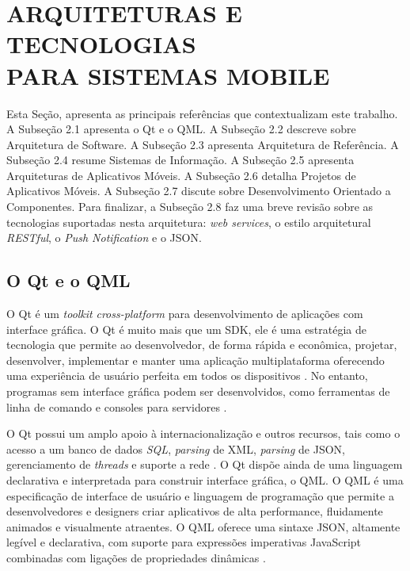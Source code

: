 \section{ARQUITETURAS E TECNOLOGIAS \\PARA SISTEMAS MOBILE}
Esta Seção, apresenta as principais referências que contextualizam este trabalho. A Subseção 2.1 apresenta o Qt e o QML. A Subseção 2.2 descreve sobre Arquitetura de Software. A Subseção 2.3 apresenta Arquitetura de Referência. A Subseção 2.4 resume Sistemas de Informação. A Subseção 2.5 apresenta Arquiteturas de Aplicativos Móveis. A Subseção 2.6 detalha Projetos de Aplicativos Móveis. A Subseção 2.7 discute sobre Desenvolvimento Orientado a Componentes. Para finalizar, a Subseção 2.8 faz uma breve revisão sobre as tecnologias suportadas nesta arquitetura: \textit{web services}, o estilo arquitetural \textit{RESTful}, o \textit{Push Notification} e o JSON.


\subsection{O Qt e o QML} %
O Qt é um \textit{toolkit} \textit{cross-platform} para desenvolvimento de aplicações com interface gráfica. O Qt é muito mais que um SDK, ele é uma estratégia de tecnologia que permite ao desenvolvedor, de forma rápida e econômica, projetar, desenvolver, implementar e manter uma aplicação multiplataforma oferecendo uma experiência de usuário perfeita em todos os dispositivos \cite{qt_io}. No entanto, programas sem interface gráfica podem ser desenvolvidos, como ferramentas de linha de comando e consoles para servidores \cite{qt_software}.\par

O Qt possui um amplo apoio à internacionalização e outros recursos, tais como o acesso a um banco de dados \textit{SQL}, \textit{parsing} de XML, \textit{parsing} de JSON, gerenciamento de \textit{threads} e suporte a rede \cite{qt_gui_toolkit}. O Qt dispõe ainda de uma linguagem declarativa e interpretada para construir interface gráfica, o QML. O QML é uma especificação de interface de usuário e linguagem de programação que permite a desenvolvedores e designers criar aplicativos de alta performance, fluidamente animados e visualmente atraentes. O QML oferece uma sintaxe JSON, altamente legível e declarativa, com suporte para expressões imperativas JavaScript combinadas com ligações de propriedades dinâmicas \cite{doc_qt_io}.


